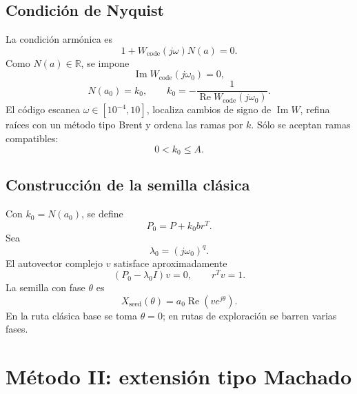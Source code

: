 \documentclass[11pt]{article}
\newcommand{\R}{\mathbb{R}}
\begin{document}
\subsection{Condición de Nyquist}

La condición armónica es
\begin{equation}
1+W_{\mathrm{code}}(j\omega)N(a)=0.
\label{eq:harmonic_classic}
\end{equation}
Como \(N(a)\in\R\), se impone
\begin{equation}
\operatorname{Im} W_{\mathrm{code}}(j\omega_0)=0,
\label{eq:im_zero}
\end{equation}
\begin{equation}
N(a_0)=k_0,
\qquad
k_0=-\frac{1}{\operatorname{Re}W_{\mathrm{code}}(j\omega_0)}.
\label{eq:k0_classic}
\end{equation}
El código escanea \(\omega\in[10^{-4},10]\), localiza cambios de signo de \(\operatorname{Im}W\), refina raíces con un método tipo Brent y ordena las ramas por \(k\). Sólo se aceptan ramas compatibles:
\begin{equation}
0<k_0\leq A.
\end{equation}

\subsection{Construcción de la semilla clásica}

Con \(k_0=N(a_0)\), se define
\begin{equation}
P_0=P+k_0br^T.
\label{eq:P0_classic}
\end{equation}
Sea
\begin{equation}
\lambda_0=(j\omega_0)^q.
\end{equation}
El autovector complejo \(v\) satisface aproximadamente
\begin{equation}
(P_0-\lambda_0I)v=0,
\qquad
r^Tv=1.
\label{eq:eig_seed}
\end{equation}
La semilla con fase \(\theta\) es
\begin{equation}
X_{\mathrm{seed}}(\theta)=a_0\operatorname{Re}\left(v e^{j\theta}\right).
\label{eq:seed_classic}
\end{equation}
En la ruta clásica base se toma \(\theta=0\); en rutas de exploración se barren varias fases.

\section{Método II: extensión tipo Machado}
\end{document}
